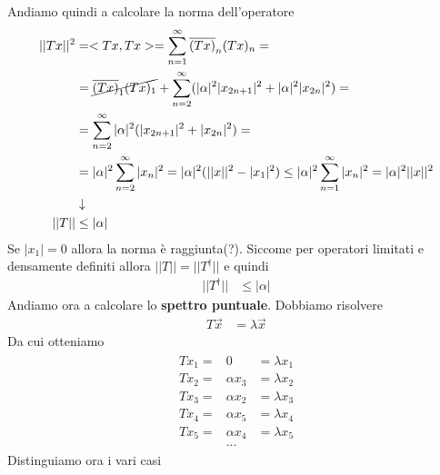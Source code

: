 Andiamo quindi a calcolare la norma dell'operatore
\begin{align}
	||Tx||^2 &= <Tx,Tx> = \sum_{n=1}^{\infty} \overline{(Tx)}_n (Tx)_n = \nonumber\\
			 &=\cancel{\overline{(Tx)}_1 (Tx)_1} + \sum_{n=2}^{\infty} (|\alpha|^2 |x_{2n+1}|^2 + |\alpha|^2 |x_{2n}|^2) = \nonumber\\
			 &=\sum_{n=2}^{\infty} |\alpha|^2( |x_{2n+1}|^2 + |x_{2n}|^2) = \nonumber\\
			 &=|\alpha|^2 \sum_{n=2}^{\infty} |x_{n}|^2 =|\alpha|^2( ||x||^2 - |x_1|^2) \leq |\alpha|^2 \sum_{n=1}^{\infty} |x_{n}|^2 = |\alpha|^2 ||x||^2 \\ &\downarrow \nonumber \\
	||T|| &\leq |\alpha|	
\end{align}
Se $|x_1|=0$ allora la norma è raggiunta(?).
Siccome per operatori limitati e densamente definiti allora $||T|| = ||T^\dagger||$ e quindi 
\begin{align}
	||T^\dagger|| &\leq |\alpha|	
\end{align}
Andiamo ora a calcolare lo \textbf{spettro puntuale}. Dobbiamo risolvere
\begin{align}
	T\vec{x} &= \lambda \vec{x}	
\end{align}
Da cui otteniamo
\begin{align}
	\begin{matrix}
		Tx_1 =& 0 &= \lambda x_1 \\
		Tx_2 =& \alpha x_3 &= \lambda x_2\\
		Tx_3 =& \alpha x_2 &= \lambda x_3\\
		Tx_4 =& \alpha x_5 &= \lambda x_4\\
		Tx_5 =& \alpha x_4 &= \lambda x_5\\
		&\dots
	\end{matrix} 
\end{align}
\newpage
Distinguiamo ora i vari casi
